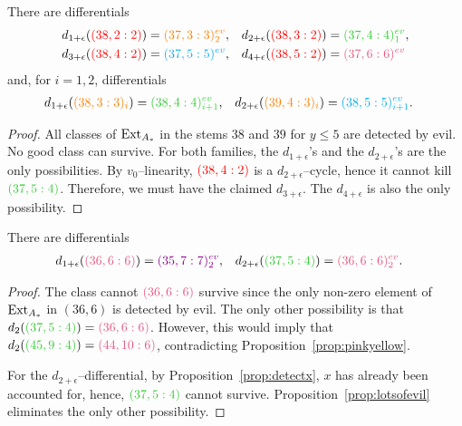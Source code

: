 \begin{prop}\label{prop:lotsofevil}
There are differentials
\begin{align*}
d_{1+\epsilon}({\color{red}(38,2 : 2)}) &= {\color{orange}(37,3 : 3)^{ev}_2},  &d_{2+\epsilon}({\color{red}(38,3 : 2)}) &= {\color{limegreen}(37,4 : 4)_1^{ev}}, \\
d_{3+\epsilon}({\color{red}(38,4: 2)}) &= {\color{cyan}(37,5 : 5)^{ev}} , & d_{4+\epsilon}({\color{red}(38,5: 2)}) &= {\color{lavenderrose}(37,6: 6)^{ev}}
\end{align*}
and, for $i=1,2$, differentials
\begin{align*}
d_{1+\epsilon}(\gdm{orange}{38}{3}{3}{i}) &=  \evm{limegreen}{38}{4}{i+1}, & d_{2+\epsilon}(\gdm{orange}{39}{4}{3}{i}) &=  \evm{cyan}{38}{5}{i+1}.
\end{align*}
\end{prop}
\begin{proof}
All classes of $\operatorname{Ext}_{A_*}$ in the stems $38$ and $39$ for $y \leq 5$ are detected by evil. No good class can survive. For both families, the $d_{1+\epsilon}$'s and the $d_{2+\epsilon}$'s are the only possibilities. By $v_0$--linearity, ${\color{red}(38,4: 2)}$ is a $d_{2+\epsilon}$--cycle, hence it cannot kill ${\color{limegreen}(37,5 : 4)}$. Therefore, we must have the claimed $d_{3+\epsilon}$. The $d_{4+\epsilon}$ is also the only possibility.
\end{proof}


\begin{prop}
There are differentials
\begin{align*}
d_{1+\epsilon}({\color{lavenderrose}(36,6 : 6)}) &={\color{darkmagenta}(35,7 : 7)_2^{ev}}, & d_{2+\epsilon}({\color{limegreen}(37,5 : 4)}) &={\color{lavenderrose}(36,6 :6)_2^{ev}}.
\end{align*}
\end{prop}
\begin{proof}
The class cannot ${\color{lavenderrose}(36,6 : 6)}$ survive since the only non-zero element of $\operatorname{Ext}_{A_*}$ in $(36,6)$ is detected by evil. The only other possibility is that $d_{2}({\color{limegreen}(37,5 : 4)}) = {\color{lavenderrose}(36,6 : 6)}$. However, this would imply that $d_{2}({\color{limegreen}(45,9 : 4)}) = {\color{lavenderrose}(44,10 : 6)}$, contradicting Proposition~\ref{prop:pinkyellow}.

For the $d_{2+\epsilon}$--differential, by Proposition~\ref{prop:detectx}, $x$ has already been accounted for, hence, 
${\color{limegreen}(37,5 : 4)}$ cannot survive. Proposition~\ref{prop:lotsofevil} eliminates the only other possibility.
\end{proof}



